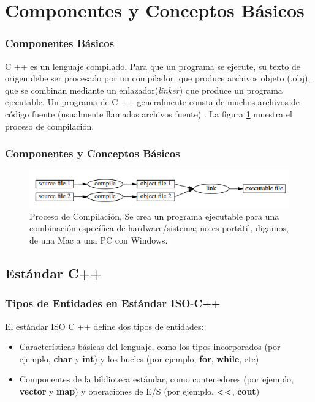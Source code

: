 \documentclass[xcolor=table]{beamer}
\begin{document}
\section{Componentes y Conceptos Básicos}
\begin{frame}
\frametitle{Componentes Básicos}
C ++ es un lenguaje compilado. Para que un programa se ejecute, su texto de origen debe ser procesado por un compilador, que produce archivos objeto (.obj), que se combinan mediante un enlazador(\emph{linker}) que produce un programa ejecutable. Un programa de C ++ generalmente consta de muchos archivos de código fuente (usualmente llamados archivos fuente) \cite{bjarne1}. La figura \ref{fig:compilar} muestra el proceso de compilación.
\end{frame}
\begin{frame}
\frametitle{Componentes y Conceptos Básicos}
\begin{figure}
    \centering
    \includegraphics[scale=0.85]{images/compile.png}
    \caption{Proceso de Compilación, Se crea un programa ejecutable para una combinación específica de hardware/sistema; no es portátil, digamos, de una Mac a una PC con Windows. \cite{bjarne1}}
    \label{fig:compilar}
\end{figure}

\end{frame}

\subsection{Estándar C++}
\begin{frame}
\frametitle{Tipos de Entidades en  Estándar ISO-C++}
El estándar ISO C ++ define dos tipos de entidades:
\begin{itemize}
\item Características básicas del lenguaje, como los tipos incorporados (por ejemplo, \textbf{char} y \textbf{int}) y los bucles (por ejemplo, \textbf{for}, \textbf{while}, etc)
\item Componentes de la biblioteca estándar, como contenedores (por ejemplo, \textbf{vector} y \textbf{map}) y operaciones de E/S
(por ejemplo, \textbf{<<}, \textbf{cout})
\end{itemize}
\end{frame}
\end{document}
